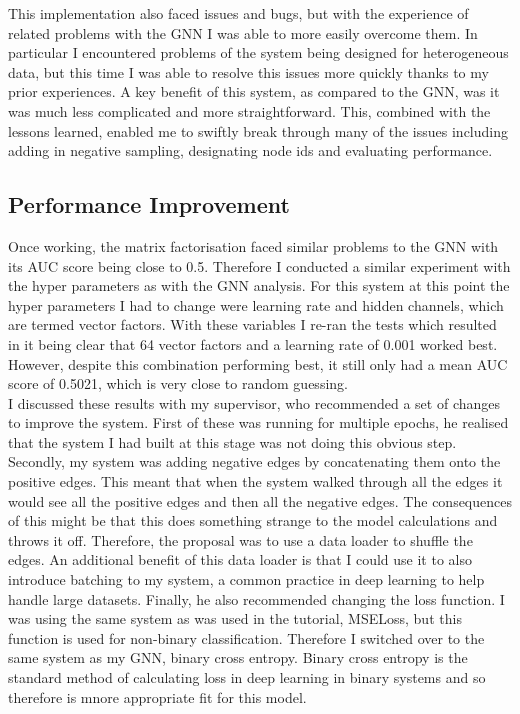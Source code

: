 \documentclass{l4proj}
\begin{document}
This implementation also faced issues and bugs, but with the experience of related problems with the GNN I was able to more easily overcome them. In particular I encountered problems of the system being designed for heterogeneous data, but this time I was able to resolve this issues more quickly thanks to my prior experiences. A key benefit of this system, as compared to the GNN, was it was much less complicated and more straightforward. This, combined with the lessons learned, enabled me to swiftly break through many of the issues including adding in negative sampling, designating node ids and evaluating performance. \\

\subsection{Performance Improvement}

Once working, the matrix factorisation faced similar problems to the GNN with its AUC score being close to 0.5. Therefore I conducted a similar experiment with the hyper parameters as with the GNN analysis. For this system at this point the hyper parameters I had to change were learning rate and hidden channels, which are termed vector factors. With these variables I re-ran the tests which resulted in it being clear that 64 vector factors and a learning rate of 0.001 worked best. However, despite this combination performing best, it still only had a mean AUC score of 0.5021, which is very close to random guessing. \\

I discussed these results with my supervisor, who recommended a set of changes to improve the system. First of these was running for multiple epochs, he realised that the system I had built at this stage was not doing this obvious step. Secondly, my system was adding negative edges by concatenating them onto the positive edges. This meant that when the system walked through all the edges it would see all the positive edges and then all the negative edges. The consequences of this might be that this does something strange to the model calculations and throws it off. Therefore, the proposal was to use a data loader to shuffle the edges. An additional benefit of this data loader is that I could use it to also introduce batching to my system, a common practice in deep learning to help handle large datasets. Finally, he also recommended changing the loss function. I was using the same system as was used in the tutorial, MSELoss, but this function is used for non-binary classification. Therefore I switched over to the same system as my GNN, binary cross entropy. Binary cross entropy is the standard method of calculating loss in deep learning in binary systems and so therefore is mnore appropriate fit for this model.\\
\end{document}
